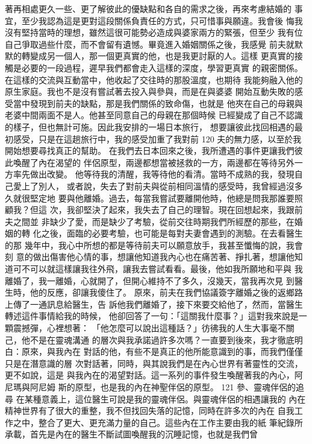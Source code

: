 著再相處更久一些、更了解彼此的優缺點和各自的需求之後，再來考慮結婚的
事宜，至少我認為這是更對這段關係負責任的方式，只可惜事與願違。我會後
悔我沒有堅持當時的理想，雖然這很可能勢必造成與婆家兩方的緊張，但至少
我有位自己爭取過些什麼，而不會留有遺憾。畢竟進入婚姻關係之後，我感覺
前夫就默默的轉變成另一個人，那一個更真實的他，也是我更討厭的人。這樣
更真實的接觸是必要的一段過程，遲早我們都會走入這樣的深度，學習更真實
的親密關係。在這樣的交流與互動當中，他收起了交往時的那股溫度，也期待
我能夠融入他的原生家庭。我也不是沒有嘗試著去投入與參與，而是在與婆婆
開始互動失敗的感受當中發現到前夫的缺點，那是我們關係的致命傷，也就是
他夾在自己的母親與老婆中間兩面不是人。他甚至同意自己的母親在那個時候
已經變成了自己不認識的樣子，但也無計可施。因此我安排的一場日本旅行，
想要讓彼此找回相遇的最初感受，只是在這趟旅行中，我的感受加重了我對前
120 
夫的無力感，以至於我開始想要尋找真正的幫助。 
在我們去日本回來之後，我所遭遇的事件更讓我們彼此喚醒了內在渴望的
伴侶原型，兩邊都想當被拯救的一方，兩邊都在等待另外一方率先做出改變。
他等待我的清醒，我等待他的看清。當時不成熟的我，發現自己愛上了別人，
或者說，失去了對前夫與從前相同溫情的感受時，我曾經過沒多久就很堅定地
要與他離婚。過去，每當我嘗試要離開他時，他總是問我那誰要照顧我？但這
次，我卻堅決了起來，我失去了自己的理智。現在回想起來，我跟前夫之間並
非缺少了愛，而是缺少了考驗，從前交往時期我們所經歷的那些，在婚姻的轉
化之後，面臨的必要考驗，也可能是每對夫妻會遇到的測驗。在去看醫生的那
幾年中，我心中所想的都是等待前夫可以願意放手，我甚至懺悔的說，我會刻
意的做出傷害他心情的事，想讓他知道我內心也在痛苦著、掙扎著，想讓他知
道可不可以就這樣讓我往外飛，讓我去嘗試看看。最後，他如我所願地和平與
我離婚了，我一離婚，心就開了，但開心維持不了多久，沒幾天，當我再次見
到醫生時，他的反應，卻讓我傻住了。 
原來，前夫在我們協議簽字離婚之後的返鄉路上傳了一通訊息給醫生，告
訴他我們離婚了，接下來要交給他了，然而，當醫生轉述這件事情給我的時候，
他卻回答了一句：「這關我什麼事？」這對我來說是一顆震撼彈，心裡想著：
「他怎麼可以說出這種話？」彷彿我的人生大事毫不關己，他不是在靈魂溝通
的層次與我承諾過許多次嗎？一直要到後來，我才徹底明白：原來，與我內在
對話的他，有些不是真正的他所能意識到的事，而我們僅僅只是在潛意識的層
次對話著，同時，與其說我們是在內心世界有著靈性的交流，更不如說，這是
與我內在的渴望對話。這一系列的事件發生喚醒著我的內心，阿尼瑪與阿尼姆
斯的原型，也是我的內在神聖伴侶的原型。 
121 
參、靈魂伴侶的追尋 
在某種意義上，這位醫生可說是我的靈魂伴侶。與靈魂伴侶的相遇讓我的
內在精神世界有了很大的重整，我不但找回失落的記憶，同時在許多次的內在
自我工作之中，整合了更大、更充滿力量的自己。這些內在工作主要由我的紙
筆紀錄所承載，首先是內在的醫生不斷試圖喚醒我的沉睡記憶，也就是我們曾
